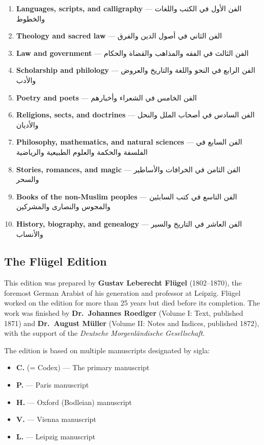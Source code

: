\documentclass[11pt,a4paper]{article}
\newcommand{\ar}[1]{{\arabicfont\beginR #1\endR}}
\begin{document}
\begin{enumerate}
  \item \textbf{Languages, scripts, and calligraphy} ---
    \ar{الفن الأول في الكتب واللغات والخطوط}
  \item \textbf{Theology and sacred law} ---
    \ar{الفن الثاني في أصول الدين والفرق}
  \item \textbf{Law and government} ---
    \ar{الفن الثالث في الفقه والمذاهب والقضاة والحكام}
  \item \textbf{Scholarship and philology} ---
    \ar{الفن الرابع في النحو واللغة والتاريخ والعروض والأدب}
  \item \textbf{Poetry and poets} ---
    \ar{الفن الخامس في الشعراء وأخبارهم}
  \item \textbf{Religions, sects, and doctrines} ---
    \ar{الفن السادس في أصحاب الملل والنحل والأديان}
  \item \textbf{Philosophy, mathematics, and natural sciences} ---
    \ar{الفن السابع في الفلسفة والحكمة والعلوم الطبيعية والرياضية}
  \item \textbf{Stories, romances, and magic} ---
    \ar{الفن الثامن في الخرافات والأساطير والسحر}
  \item \textbf{Books of the non-Muslim peoples} ---
    \ar{الفن التاسع في كتب السابئين والمجوس والنصارى والمشركين}
  \item \textbf{History, biography, and genealogy} ---
    \ar{الفن العاشر في التاريخ والسير والأنساب}
\end{enumerate}

\subsection{The Fl\"ugel Edition}

This edition was prepared by \textbf{Gustav Leberecht Fl\"ugel}
(1802--1870), the foremost German Arabist of his generation and
professor at Leipzig. Fl\"ugel worked on the edition for more than 25
years but died before its completion. The work was finished by
\textbf{Dr.~Johannes Roediger} (Volume I: Text, published 1871) and
\textbf{Dr.~August M\"uller} (Volume II: Notes and Indices, published 1872),
with the support of the \textit{Deutsche Morgenl\"andische Gesellschaft}.

The edition is based on multiple manuscripts designated by sigla:
\begin{itemize}
  \item \textbf{C.} (= Codex) --- The primary manuscript
  \item \textbf{P.} --- Paris manuscript
  \item \textbf{H.} --- Oxford (Bodleian) manuscript
  \item \textbf{V.} --- Vienna manuscript
  \item \textbf{L.} --- Leipzig manuscript
\end{itemize}
\end{document}
